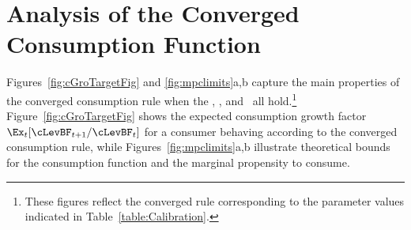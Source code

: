 \documentclass[BufferStockTheory]{subfiles}
\begin{document}

\hypertarget{AnalysisoftheConvergedConsumptionFunction}{}
\section{Analysis of the Converged Consumption Function}

Figures~\ref{fig:cGroTargetFig} and \ref{fig:mpclimits}a,b capture the
main properties of the converged consumption rule when the \RIC, \GIC,
and \FHWC~all hold.\footnote{These figures reflect the converged rule
  corresponding to the parameter values indicated in
  Table~\ref{table:Calibration}.}  Figure~\ref{fig:cGroTargetFig}
shows the expected consumption growth factor
$\Ex_{t}[\cLevBF_{t+1}/\cLevBF_{t}]$ for a consumer behaving according to
the converged consumption rule, while Figures~\ref{fig:mpclimits}a,b
illustrate theoretical bounds for the consumption function and the
marginal propensity to consume.
\end{document}
